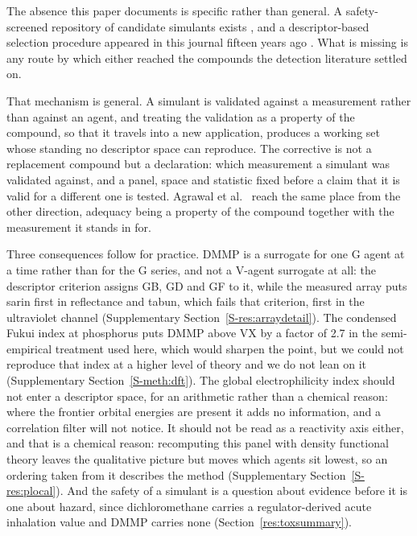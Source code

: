 \documentclass[1p,times]{elsarticle}
\begin{document}
The absence this paper documents is specific rather than general. A
safety-screened repository of candidate simulants exists \cite{james2021}, and a
descriptor-based selection procedure appeared in this journal fifteen years ago
\cite{lavoie2011}. What is missing is any route by which either reached the
compounds the detection literature settled on.

That mechanism is general. A simulant is validated against a measurement rather
than against an agent, and treating the validation as a property of the compound,
so that it travels into a new application, produces a working set whose standing
no descriptor space can reproduce. The corrective is not a replacement compound
but a declaration: which measurement a simulant was validated against, and a
panel, space and statistic fixed before a claim that it is valid for a different
one is tested. Agrawal et al.~\cite{agrawal2018} reach the same place from the
other direction, adequacy being a property of the compound together with the
measurement it stands in for.

Three consequences follow for practice. DMMP is a surrogate for one G agent at a
time rather than for the G series, and not a V-agent surrogate at all: the
descriptor criterion assigns GB, GD and GF to it, while the measured array puts
sarin first in reflectance and tabun, which fails that criterion, first in the
ultraviolet channel (Supplementary Section~\ref{S-res:arraydetail}). The
condensed Fukui index at phosphorus puts DMMP above VX by a factor of 2.7 in the
semi-empirical treatment used here, which would sharpen the point, but we could
not reproduce that index at a higher level of theory and we do not lean on it
(Supplementary Section~\ref{S-meth:dft}). The global electrophilicity index
should not enter a descriptor space, for an arithmetic rather than a chemical
reason: where the frontier orbital energies are present it adds no information,
and a correlation filter will not notice. It should not be read as a reactivity
axis either, and that is a chemical reason: recomputing this panel with density
functional theory leaves the qualitative picture but moves which agents sit
lowest, so an ordering taken from it describes the method
(Supplementary Section~\ref{S-res:plocal}). And
the safety of a simulant is a question about evidence before it is one about
hazard, since dichloromethane carries a regulator-derived acute inhalation value
and DMMP carries none (Section~\ref{res:toxsummary}).
\end{document}
